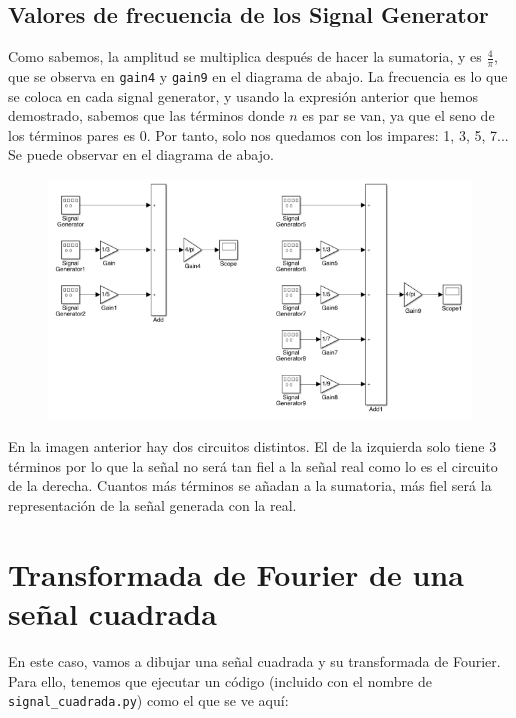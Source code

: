 \documentclass[11pt,a4paper]{article}
\begin{document}
\subsection{Valores de frecuencia de los Signal Generator}

Como sabemos, la amplitud se multiplica después de hacer la sumatoria, y es $\frac{4}{\pi}$, que se observa en \texttt{gain4} y \texttt{gain9} en el diagrama de abajo. La frecuencia es lo que se coloca en cada signal generator, y usando la expresión anterior que hemos demostrado, sabemos que las términos donde $n$ es par se van, ya que el seno de los términos pares es 0. Por tanto, solo nos quedamos con los impares: 1, 3, 5, 7... Se puede observar en el diagrama de abajo.

\begin{figure}[H]
	\centering
	\includegraphics[scale=0.65]{img/simulink.png}
\end{figure}

En la imagen anterior hay dos circuitos distintos. El de la izquierda solo tiene 3 términos por lo que la señal no será  tan fiel a la señal real como lo es el circuito de la derecha. Cuantos más términos se añadan a la sumatoria, más fiel será la representación de la señal generada con la real.

\newpage

\section{Transformada de Fourier de una señal cuadrada}

En este caso, vamos a dibujar una señal cuadrada y su transformada de Fourier. Para ello, tenemos que ejecutar un código (incluido con el nombre de \texttt{signal\_cuadrada.py}) como el que se ve aquí:\\
\end{document}

